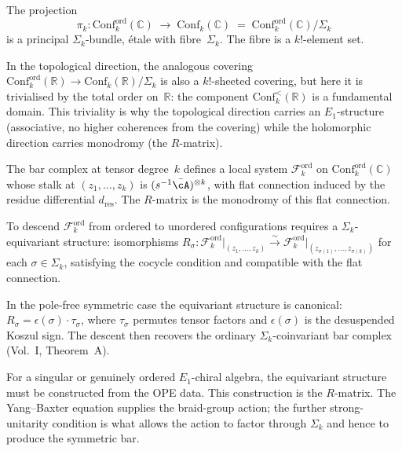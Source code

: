 \begin{construction}
\label{constr:covering-space}
The projection
\[
\pi_k\colon
\mathrm{Conf}_k^{\mathrm{ord}}(\mathbb C)
\;\longrightarrow\;
\mathrm{Conf}_k(\mathbb C)
\;=\;
\mathrm{Conf}_k^{\mathrm{ord}}(\mathbb C)/\Sigma_k
\]
is a principal $\Sigma_k$-bundle, \'etale with fibre~$\Sigma_k$.
The fibre is a $k!$-element set.

In the topological direction, the analogous covering
$\mathrm{Conf}_k^{\mathrm{ord}}(\mathbb R)\to
\mathrm{Conf}_k(\mathbb R)/\Sigma_k$
is also a $k!$-sheeted covering, but here it is trivialised
by the total order on~$\mathbb R$: the component
$\mathrm{Conf}_k^{<}(\mathbb R)$ is a fundamental domain.
This triviality is why the topological direction carries
an $E_1$-structure (associative, no higher coherences from
the covering) while the holomorphic direction carries
monodromy (the $R$-matrix).

The bar complex at tensor degree~$k$ defines a local system
$\mathcal{F}_k^{\mathrm{ord}}$ on
$\mathrm{Conf}_k^{\mathrm{ord}}(\mathbb C)$
whose stalk at $(z_1,\dots,z_k)$ is
$(s^{-1}\bar\cA)^{\otimes k}$, with flat connection induced
by the residue differential $d_{\mathrm{res}}$. The
$R$-matrix is the monodromy of this flat connection.

To descend $\mathcal{F}_k^{\mathrm{ord}}$ from ordered to
unordered configurations requires a $\Sigma_k$-equivariant
structure: isomorphisms
$R_\sigma\colon
\mathcal{F}_k^{\mathrm{ord}}\big|_{(z_1,\dots,z_k)}
\xrightarrow{\sim}
\mathcal{F}_k^{\mathrm{ord}}\big|_{(z_{\sigma(1)},\dots,z_{\sigma(k)})}$
for each $\sigma\in\Sigma_k$, satisfying the cocycle condition
and compatible with the flat connection.

In the pole-free symmetric case the equivariant structure is
canonical: $R_\sigma=\epsilon(\sigma)\cdot\tau_\sigma$, where
$\tau_\sigma$ permutes tensor factors and $\epsilon(\sigma)$ is the
desuspended Koszul sign. The descent then recovers the ordinary
$\Sigma_k$-coinvariant bar complex (Vol.~I, Theorem~A).

For a singular or genuinely ordered $E_1$-chiral algebra, the
equivariant structure must be constructed from the OPE data. This
construction is the $R$-matrix. The Yang--Baxter equation supplies the
braid-group action; the further strong-unitarity condition is what
allows the action to factor through $\Sigma_k$ and hence to produce the
symmetric bar.
\end{construction}

